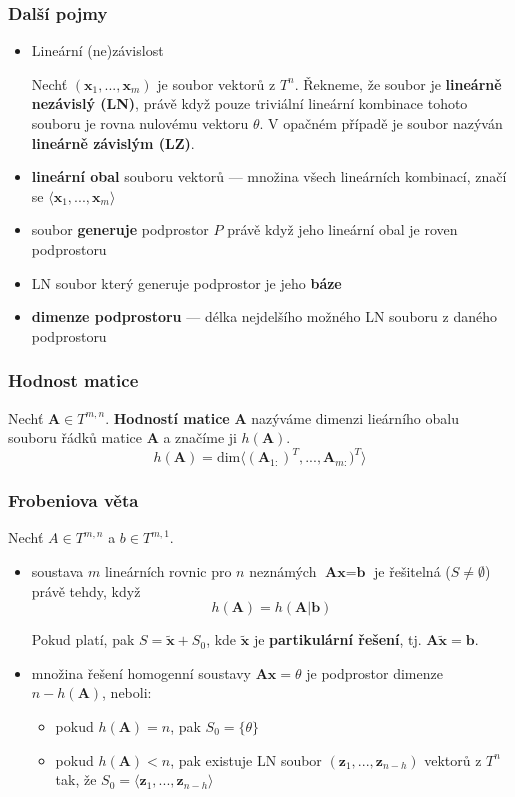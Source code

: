 \subsubsection*{Další pojmy}
\begin{itemize}
	\item Lineární (ne)závislost
	
	Nechť $(\textbf{x}_1,...,\textbf{x}_m)$ je soubor vektorů z $T^n$. Řekneme, že soubor je \textbf{lineárně nezávislý (LN)}, právě když pouze triviální lineární kombinace tohoto souboru je rovna nulovému vektoru $\theta$. V opačném případě je soubor nazýván \textbf{lineárně závislým (LZ)}.
	
	\item \textbf{lineární obal} souboru vektorů --- množina všech lineárních kombinací, značí se $\langle \textbf{x}_1,...,\textbf{x}_m \rangle$
	\item soubor \textbf{generuje} podprostor $P$ právě když jeho lineární obal je roven podprostoru
	\item LN soubor který generuje podprostor je jeho \textbf{báze}
	\item \textbf{dimenze podprostoru} --- délka nejdelšího možného LN souboru z daného podprostoru
\end{itemize}

\subsubsection*{Hodnost matice}
Nechť $\textbf{A} \in T^{m,n}$. \textbf{Hodností matice} $\textbf{A}$ nazýváme dimenzi lieárního obalu souboru řádků matice $\textbf{A}$ a značíme ji $h(\textbf{A})$. \[ h(\textbf{A}) = \text{dim} \langle (\textbf{A}_{1:})^T,...,\textbf{A}_{m:})^T \rangle \]

\subsubsection*{Frobeniova věta}
Nechť $A \in T^{m, n}$ a $b \in T^{m,1}$.
\begin{itemize}
	\item soustava $m$ lineárních rovnic pro $n$ neznámých $\textbf{Ax} = \textbf{b}$ je řešitelná ($S \neq \emptyset$) právě tehdy, když \[h(\textbf{A}) = h(\textbf{A}|\textbf{b})\]
	
	Pokud platí, pak $ S = \tilde{\textbf{x}} + S_0$, kde $\tilde{\textbf{x}}$ je \textbf{partikulární řešení}, tj. $\textbf{A}\tilde{\textbf{x}} = \textbf{b}$.
	\item množina řešení homogenní soustavy $\textbf{Ax} = \theta$ je podprostor dimenze $n - h(\textbf{A})$, neboli:
	\begin{itemize}
		\item pokud $h(\textbf{A}) = n$, pak $S_0 = \{\theta\}$
		\item pokud $h(\textbf{A}) < n$, pak existuje LN soubor $(\textbf{z}_1,...,\textbf{z}_{n-h})$ vektorů z $T^n$ tak, že $S_0 = \langle \textbf{z}_1,...,\textbf{z}_{n-h} \rangle$
	\end{itemize}
\end{itemize}
